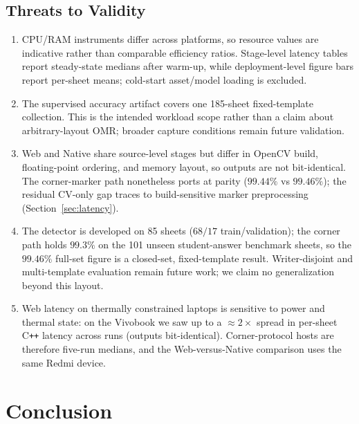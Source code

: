 \documentclass[conference]{IEEEtran}
\begin{document}
\subsection{Threats to Validity}
\label{sec:threats}
\begin{enumerate}[label=(\roman*), leftmargin=*, itemsep=1pt, topsep=2pt]
  \item CPU/RAM instruments differ across platforms, so resource values are
indicative rather than comparable efficiency ratios. Stage-level latency tables
report steady-state medians after warm-up, while deployment-level figure bars
report per-sheet means; cold-start asset/model loading is excluded.
  \item The supervised accuracy artifact covers one 185-sheet
  fixed-template collection. This is the intended workload scope rather
  than a claim about arbitrary-layout OMR; broader capture conditions remain future validation.
  \item   Web and Native share source-level stages but differ in OpenCV build,
  floating-point ordering, and memory layout, so outputs are not bit-identical.
  The corner-marker path nonetheless ports at parity ($99.44\%$ vs $99.46\%$);
  the residual CV-only gap traces to build-sensitive marker preprocessing
  (Section~\ref{sec:latency}).
  \item      The detector is developed on 85 sheets ($68/17$ train/validation); the corner
path holds $99.3\%$ on the 101 unseen student-answer benchmark sheets, so the
$99.46\%$ full-set figure is a closed-set, fixed-template result. Writer-disjoint and multi-template
  evaluation remain future work; we claim no generalization beyond this layout.
  \item Web latency on thermally constrained laptops is sensitive to power
  and thermal state: on the Vivobook we saw up to a $\approx 2\times$ spread
  in per-sheet C\texttt{++} latency across runs (outputs bit-identical).
  Corner-protocol hosts are therefore five-run medians, and the
  Web-versus-Native comparison uses the same Redmi device.
\end{enumerate}

\section{Conclusion}
\end{document}

